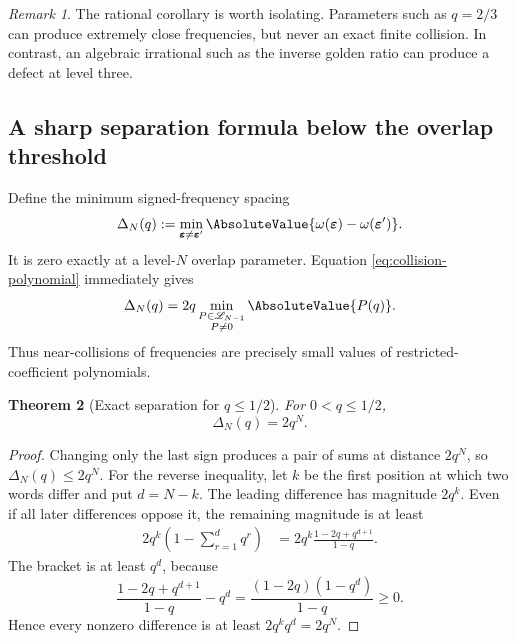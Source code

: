 \documentclass[11pt]{article}
\numberwithin{equation}{section}
\newtheorem{theorem}{Theorem}[section]
\theoremstyle{definition}
\theoremstyle{remark}
\newtheorem{remark}[theorem]{Remark}
\newcommand{\eps}{\varepsilon}
\begin{document}
\begin{remark}
The rational corollary is worth isolating.  Parameters such as $q=2/3$ can
produce extremely close frequencies, but never an exact finite collision.  In
contrast, an algebraic irrational such as the inverse golden ratio can produce
a defect at level three.
\end{remark}

\subsection{A sharp separation formula below the overlap threshold}

Define the minimum signed-frequency spacing
\begin{equation}
 \Delta_N(q):=
 \min_{\bm\eps\ne\bm\eps'}
 \AbsoluteValue{\omega(\bm\eps)-\omega(\bm\eps')}.
 \label{eq:frequency-separation}
\end{equation}
It is zero exactly at a level-$N$ overlap parameter.  Equation
\eqref{eq:collision-polynomial} immediately gives
\begin{equation}
 \Delta_N(q)=2q
 \min_{\substack{P\in\mathscr L_{N-1}\\P\ne0}}
 \AbsoluteValue{P(q)}.
 \label{eq:separation-Littlewood}
\end{equation}
Thus near-collisions of frequencies are precisely small values of
restricted-coefficient polynomials.

\begin{theorem}[Exact separation for $q\le1/2$]
\label{thm:exact-separation}
For $0<q\le1/2$,
\begin{equation}
 \boxed{\Delta_N(q)=2q^N.}
 \label{eq:exact-gap}
\end{equation}
\end{theorem}
\begin{proof}
Changing only the last sign produces a pair of sums at distance $2q^N$, so
$\Delta_N(q)\le2q^N$.  For the reverse inequality, let $k$ be the first
position at which two words differ and put $d=N-k$.  The leading difference
has magnitude $2q^k$.  Even if all later differences oppose it, the remaining
magnitude is at least
\begin{align*}
 2q^k\left(1-\sum_{r=1}^{d}q^r\right)
 &=2q^k\frac{1-2q+q^{d+1}}{1-q}.
\end{align*}
The bracket is at least $q^d$, because
\[
 \frac{1-2q+q^{d+1}}{1-q}-q^d
 =\frac{(1-2q)(1-q^d)}{1-q}\ge0.
\]
Hence every nonzero difference is at least $2q^kq^d=2q^N$.
\end{proof}
\end{document}

